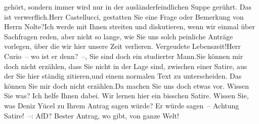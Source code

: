 \documentclass{article}
\begin{document}
gehört, sondern immer wird nur in der ausländerfeindlichen Suppe gerührt. Das ist verwerflich.Herr Castellucci, gestatten Sie eine Frage oder Bemerkung von Herrn Nolte?Ich werde mit Ihnen streiten und diskutieren, wenn wir einmal über Sachfragen reden, aber nicht so lange, wie Sie uns solch peinliche Anträge vorlegen, über die wir hier unsere Zeit verlieren. Vergeudete Lebenszeit!Herr Curio – wo ist er denn? –, Sie sind doch ein studierter Mann.Sie können mir doch nicht erzählen, dass Sie nicht in der Lage sind, zwischen einer Satire, aus der Sie hier ständig zitieren,und einem normalen Text zu unterscheiden. Das können Sie mir doch nicht erzählen.Da machen Sie uns doch etwas vor. Wissen Sie was? Ich helfe Ihnen dabei. Wir lernen hier ein bisschen Satire. Wissen Sie, was Deniz Yücel zu Ihrem Antrag sagen würde? Er würde sagen – Achtung Satire! –: AfD? Bester Antrag, wo gibt, von ganze Welt!
\end{document}
